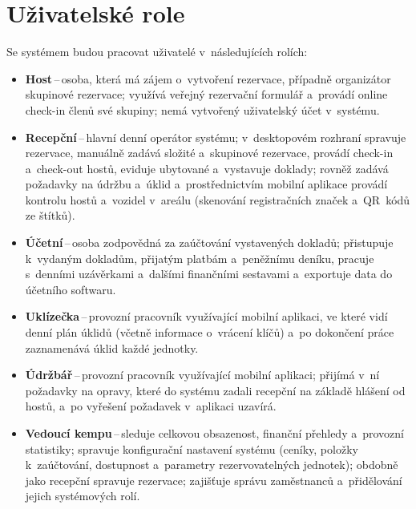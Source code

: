 \section{Uživatelské role}
\label{sec:role}
Se systémem budou pracovat uživatelé v~následujících rolích:
\begin{itemize}
    \item \textbf{Host}\,--\,osoba, která má zájem o~vytvoření rezervace, případně organizátor skupinové rezervace; využívá veřejný rezervační formulář a~provádí online check-in členů své skupiny; nemá vytvořený uživatelský účet v~systému.
    \item \textbf{Recepční}\,--\,hlavní denní operátor systému; v~desktopovém rozhraní spravuje rezervace, manuálně zadává složité a~skupinové rezervace, provádí check-in a~check-out hostů, eviduje ubytované a~vystavuje doklady; rovněž zadává požadavky na údržbu a~úklid a~prostřednictvím mobilní aplikace provádí kontrolu hostů a~vozidel v~areálu (skenování registračních značek a~QR~kódů ze štítků).
    \item \textbf{Účetní}\,--\,osoba zodpovědná za zaúčtování vystavených dokladů; přistupuje k~vydaným dokladům, přijatým platbám a~peněžnímu deníku, pracuje s~denními uzávěrkami a~dalšími finančními sestavami a~exportuje data do účetního softwaru.
    \item \textbf{Uklízečka}\,--\,provozní pracovník využívající mobilní aplikaci, ve které vidí denní plán úklidů (včetně informace o~vrácení klíčů) a~po dokončení práce zaznamenává úklid každé jednotky.
    \item \textbf{Údržbář}\,--\,provozní pracovník využívající mobilní aplikaci; přijímá v~ní požadavky na opravy, které do systému zadali recepční na základě hlášení od hostů, a~po vyřešení požadavek v~aplikaci uzavírá.
    \item \textbf{Vedoucí kempu}\,--\,sleduje celkovou obsazenost, finanční přehledy a~provozní statistiky; spravuje konfigurační nastavení systému (ceníky, položky k~zaúčtování, dostupnost a~parametry rezervovatelných jednotek); obdobně jako recepční spravuje rezervace; zajišťuje správu zaměstnanců a~přidělování jejich systémových rolí.
\end{itemize}


